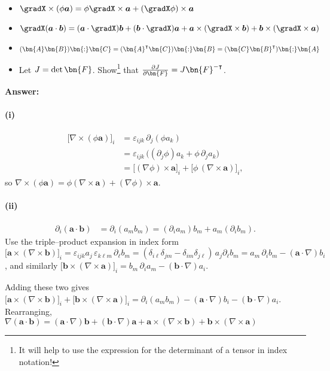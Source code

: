 \begin{itemize}
    \item $\gradX \times (\phi \bm{a}) = \phi \gradX \times \bm{a} + (\gradX\phi) \times \bm{a}$
    \item $\gradX (\bm{a} \cdot \bm{b}) = (\bm{a} \cdot \gradX) \bm{b} + (\bm{b} \cdot \gradX) \bm{a} + \bm{a} \times (\gradX \times \bm{b}) + \bm{b} \times (\gradX \times \bm{a})$
    \item $ (\bn{A} \bn{B}) \bn{:} \bn{C} = (\bn{A}^\intercal \bn{C})\bn{:} \bn{B} = (\bn{C} \bn{B}^\intercal)\bn{:} \bn{A}$
    \item Let $J = \det \bn{F}$. Show\footnote{It will help to use the expression for the determinant of a tensor in index notation!} that $\frac{\partial J}{\partial \bn{F}} = J \bn{F}^{-\intercal}$. 
    \end{itemize}

\bigskip
\textbf{Answer:}
\paragraph{(i)}
\begin{align*}
\big[\nabla \times (\phi \bm{a})\big]_i
&= \varepsilon_{ijk}\,\partial_j(\phi a_k) \\
&= \varepsilon_{ijk}\,\big((\partial_j \phi)a_k + \phi\,\partial_j a_k\big) \\
&= \big[(\nabla \phi)\times \bm{a}\big]_i + \big[\phi\,(\nabla \times \bm{a})\big]_i,
\end{align*}
so
$\nabla \times (\phi \bm{a}) = \phi (\nabla \times \bm{a}) + (\nabla \phi)\times \bm{a}$.

\paragraph{(ii)}
\begin{align*}
\partial_i(\bm{a}\cdot\bm{b})
&=\partial_i(a_m b_m)=(\partial_i a_m)b_m+a_m(\partial_i b_m).
\end{align*}
Use the triple–product expansion in index form
$\big[\bm{a}\times(\nabla\times\bm{b})\big]_i
=\varepsilon_{ijk}a_j\,\varepsilon_{k\ell m}\,\partial_\ell b_m
=(\delta_{i\ell}\delta_{jm}-\delta_{im}\delta_{j\ell})\,a_j\partial_\ell b_m
= a_m\,\partial_i b_m-(\bm{a}\cdot\nabla)b_i$,
and similarly
$\big[\bm{b}\times(\nabla\times\bm{a})\big]_i
= b_m\,\partial_i a_m-(\bm{b}\cdot\nabla)a_i$.

Adding these two gives
$\big[\bm{a}\times(\nabla\times\bm{b})\big]_i
+\big[\bm{b}\times(\nabla\times\bm{a})\big]_i
= \partial_i(a_m b_m)-(\bm{a}\cdot\nabla)b_i-(\bm{b}\cdot\nabla)a_i$.
Rearranging,
$\nabla(\bm{a}\cdot\bm{b})
=(\bm{a}\cdot\nabla)\bm{b}+(\bm{b}\cdot\nabla)\bm{a}
+\bm{a}\times(\nabla\times\bm{b})+\bm{b}\times(\nabla\times\bm{a})$

